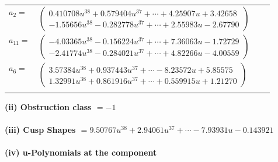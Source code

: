 \documentclass[1p]{elsarticle_modified}
\theoremstyle{definition}
\begin{document}
\begin{tabular}{m{7pt} m{180pt} m{7pt} m{180pt} }
\flushright $a_{2}=$&$\begin{pmatrix}0.410708 u^{38}+0.579404 u^{37}+\cdots+4.25907 u+3.42658\\-1.55656 u^{38}-0.282778 u^{37}+\cdots+2.55983 u-2.67790\end{pmatrix}$ \\
\flushright $a_{11}=$&$\begin{pmatrix}-4.03365 u^{38}-0.156224 u^{37}+\cdots+7.36063 u-1.72729\\-2.41774 u^{38}-0.284021 u^{37}+\cdots+4.82266 u-4.00559\end{pmatrix}$ \\
\flushright $a_{6}=$&$\begin{pmatrix}3.57384 u^{38}+0.937443 u^{37}+\cdots-8.23572 u+5.85575\\1.32991 u^{38}+0.861916 u^{37}+\cdots+0.559915 u+1.21270\end{pmatrix}$\\&\end{tabular}
\flushleft \textbf{(ii) Obstruction class $= -1$}\\~\\
\flushleft \textbf{(iii) Cusp Shapes $= 9.50767 u^{38}+2.94061 u^{37}+\cdots-7.93931 u-0.143921$}\\~\\
\newpage\renewcommand{\arraystretch}{1}
\flushleft \textbf{(iv) u-Polynomials at the component}\newline \\
\end{document}
